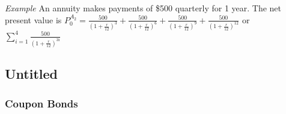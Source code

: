 \documentclass[12pt,letterpaper, twocolumn]{article}
\begin{document}
\textit{Example}
An annuity makes payments of \$500 quarterly for 1 year. The net present value is $P_0^{A_2}= \frac{500}{(1+\frac{r}{12})^3} + \frac{500}{(1+\frac{r}{12})^6} + \frac{500}{(1+\frac{r}{12})^9} + \frac{500}{(1+\frac{r}{12})^{12}}$ or $\sum_{i=1}^{4}\frac{500}{(1+\frac{r}{12})^{3i}}$

\subsection{Untitled}
\subsubsection{Coupon Bonds}
\end{document}

